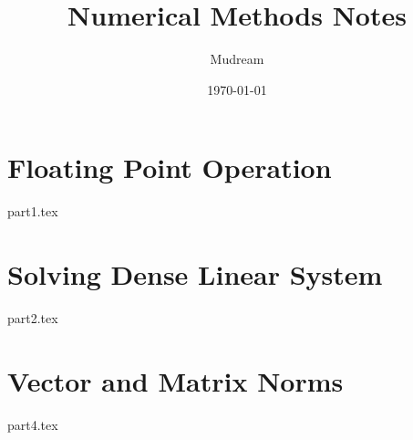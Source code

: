 \documentclass{article}
\title{Numerical Methods Notes}
\author{Mudream}
\date{\today}
\begin{document}
    \maketitle
    \part{Floating Point Operation}
    {part1.tex}
    \part{Solving Dense Linear System}
    {part2.tex}
    \part{Vector and Matrix Norms}
    {part4.tex}
\end{document}
